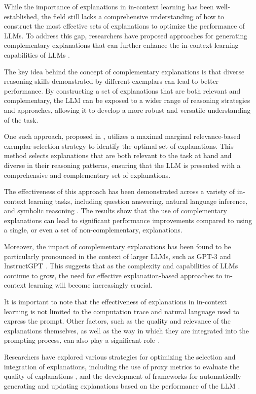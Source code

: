 \documentclass[11pt]{article}
\begin{document}
While the importance of explanations in in-context learning has been well-established, the field still lacks a comprehensive understanding of how to construct the most effective sets of explanations to optimize the performance of LLMs. To address this gap, researchers have proposed approaches for generating complementary explanations that can further enhance the in-context learning capabilities of LLMs \cite{ref196}.

The key idea behind the concept of complementary explanations is that diverse reasoning skills demonstrated by different exemplars can lead to better performance. By constructing a set of explanations that are both relevant and complementary, the LLM can be exposed to a wider range of reasoning strategies and approaches, allowing it to develop a more robust and versatile understanding of the task.

One such approach, proposed in \cite{ref196}, utilizes a maximal marginal relevance-based exemplar selection strategy to identify the optimal set of explanations. This method selects explanations that are both relevant to the task at hand and diverse in their reasoning patterns, ensuring that the LLM is presented with a comprehensive and complementary set of explanations.

The effectiveness of this approach has been demonstrated across a variety of in-context learning tasks, including question answering, natural language inference, and symbolic reasoning \cite{ref196}. The results show that the use of complementary explanations can lead to significant performance improvements compared to using a single, or even a set of non-complementary, explanations.

Moreover, the impact of complementary explanations has been found to be particularly pronounced in the context of larger LLMs, such as GPT-3 and InstructGPT \cite{ref196}. This suggests that as the complexity and capabilities of LLMs continue to grow, the need for effective explanation-based approaches to in-context learning will become increasingly crucial.

It is important to note that the effectiveness of explanations in in-context learning is not limited to the computation trace and natural language used to express the prompt. Other factors, such as the quality and relevance of the explanations themselves, as well as the way in which they are integrated into the prompting process, can also play a significant role \cite{ref221,ref222}.

Researchers have explored various strategies for optimizing the selection and integration of explanations, including the use of proxy metrics to evaluate the quality of explanations \cite{ref222}, and the development of frameworks for automatically generating and updating explanations based on the performance of the LLM \cite{ref223}.
\end{document}
